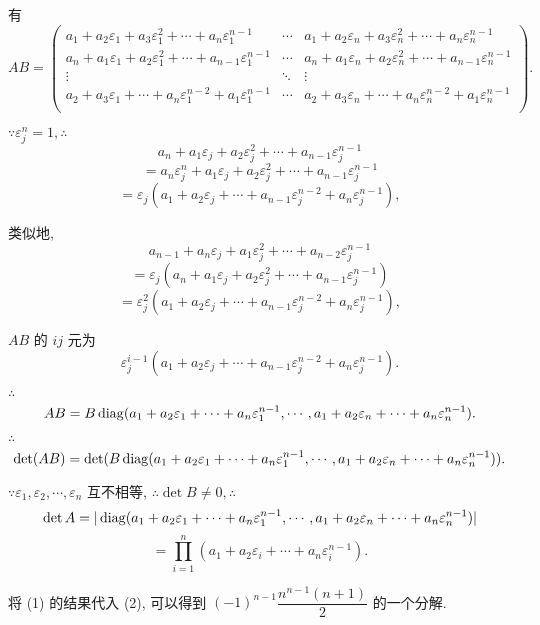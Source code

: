\documentclass{ctexart}
\begin{document}
\begin{solution}
    有
    \[AB=\begin{pmatrix}
        a_1+a_2\varepsilon_1+a_3\varepsilon_1^2+\cdots+a_n\varepsilon_1^{n-1} & \cdots & a_1+a_2\varepsilon_n+a_3\varepsilon_n^2+\cdots+a_n\varepsilon_n^{n-1} \\
        a_n+a_1\varepsilon_1+a_2\varepsilon_1^2+\cdots+a_{n-1}\varepsilon_1^{n-1} & \cdots & a_n+a_1\varepsilon_n+a_2\varepsilon_n^2+\cdots+a_{n-1}\varepsilon_n^{n-1} \\
        \vdots & \ddots & \vdots \\
        a_2+a_3\varepsilon_1+\cdots+a_n\varepsilon_1^{n-2}+a_1\varepsilon_1^{n-1} & \cdots & a_2+a_3\varepsilon_n+\cdots+a_n\varepsilon_n^{n-2}+a_1\varepsilon_n^{n-1} \\
    \end{pmatrix}.\]

    $\because\varepsilon_j^n=1,\therefore$
    \[a_n+a_1\varepsilon_j+a_2\varepsilon_j^2+\cdots+a_{n-1}\varepsilon_j^{n-1}\]
    \[=a_n\varepsilon_j^n+a_1\varepsilon_j+a_2\varepsilon_j^2+\cdots+a_{n-1}\varepsilon_j^{n-1}\]
    \[=\varepsilon_j(a_1+a_2\varepsilon_j+\cdots+a_{n-1}\varepsilon_j^{n-2}+a_n\varepsilon_j^{n-1}),\]

    类似地,
    \[a_{n-1}+a_n\varepsilon_j+a_1\varepsilon_j^2+\cdots+a_{n-2}\varepsilon_j^{n-1}\]
    \[=\varepsilon_j(a_n+a_1\varepsilon_j+a_2\varepsilon_j^2+\cdots+a_{n-1}\varepsilon_j^{n-1})\]
    \[=\varepsilon_j^2(a_1+a_2\varepsilon_j+\cdots+a_{n-1}\varepsilon_j^{n-2}+a_n\varepsilon_j^{n-1}),\]

    $AB$ 的 $ij$ 元为
    \[\varepsilon_j^{i-1}(a_1+a_2\varepsilon_j+\cdots+a_{n-1}\varepsilon_j^{n-2}+a_n\varepsilon_j^{n-1}).\]

    $\therefore$
    \[AB=B\operatorname{diag} (a_1+a_2\varepsilon_1+\cdots+a_n\varepsilon_1^{n-1},\cdots,a_1+a_2\varepsilon_n+\cdots+a_n\varepsilon_n^{n-1}).\]

    $\therefore$
    \[\det(AB)=\det(B\operatorname{diag} (a_1+a_2\varepsilon_1+\cdots+a_n\varepsilon_1^{n-1},\cdots,a_1+a_2\varepsilon_n+\cdots+a_n\varepsilon_n^{n-1})).\]

    $\because\varepsilon_1,\varepsilon_2,\cdots,\varepsilon_n$ 互不相等, $\therefore\det B\neq0,\therefore$
    \[\det A=|\operatorname{diag} (a_1+a_2\varepsilon_1+\cdots+a_n\varepsilon_1^{n-1},\cdots,a_1+a_2\varepsilon_n+\cdots+a_n\varepsilon_n^{n-1})|\]
    \[=\prod\limits_{i=1}^n(a_1+a_2\varepsilon_i+\cdots+a_n\varepsilon_i^{n-1}).\]
\end{solution}
\begin{note}
    将 (1) 的结果代入 (2), 可以得到 $(-1)^{n-1}\dfrac{n^{n-1}(n+1)}{2}$ 的一个分解.
\end{note}
\end{document}
